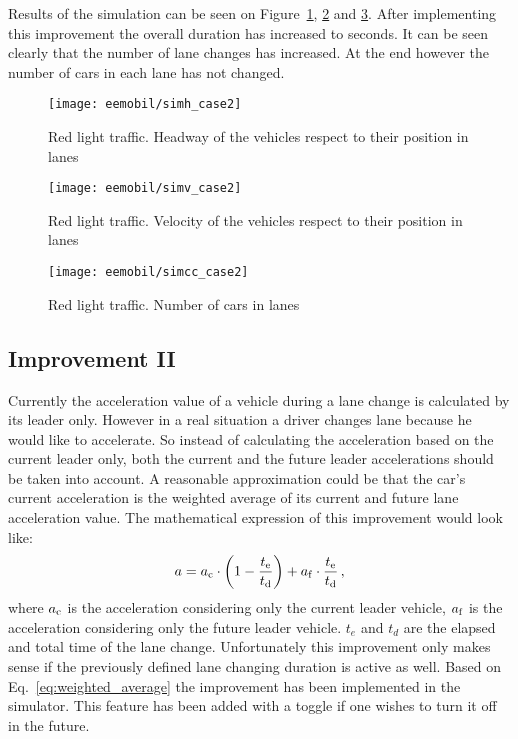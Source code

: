 		Results of the simulation can be seen on Figure~\ref{fig:red_light_situationh_impr1}, \ref{fig:red_light_situationv_impr1} and \ref{fig:red_light_situationcc_impr1}. After implementing this improvement the overall duration has increased to seconds. It can be seen clearly that the number of lane changes has increased. At the end however the number of cars in each lane has not changed.
		\begin{figure}
			\centering
			\texttt{[image: eemobil/simh\_case2]}
			\caption{Red light traffic. Headway of the vehicles respect to their position in lanes}
			\label{fig:red_light_situationh_impr1}
		\end{figure}
		\begin{figure}
			\centering
			\texttt{[image: eemobil/simv\_case2]}
			\caption{Red light traffic. Velocity of the vehicles respect to their position in lanes}
			\label{fig:red_light_situationv_impr1}
		\end{figure}
		\begin{figure}
			\centering
			\texttt{[image: eemobil/simcc\_case2]}
			\caption{Red light traffic. Number of cars in lanes }
			\label{fig:red_light_situationcc_impr1}
		\end{figure}
		\subsection{Improvement II}
		Currently the acceleration value of a vehicle during a lane change is calculated by its leader only. However in a real situation a driver changes lane because he would like to accelerate. So instead of calculating the acceleration based on the current leader only, both the current and the future leader accelerations should be taken into account. A reasonable approximation could be that the car's current acceleration is the weighted average of its current and future lane acceleration value. The mathematical expression of this improvement would look like:
		\begin{equation}
			a=a_{\rm c} \cdot \left(1-\frac{t_{\rm e}}{t_{\rm d}}\right) + a_{\rm f}\cdot \frac{t_{\rm e}}{t_{\rm d}}\,,
			\label{eq:weighted_average}
		\end{equation}
		where $a_{\rm c}$ is the acceleration considering only the current leader vehicle, $a_{\rm f}$ is the acceleration considering only the future leader vehicle. $t_e$ and $t_d$ are the elapsed and total time of the lane change. Unfortunately this improvement only makes sense if the previously defined lane changing duration is active as well. Based on Eq.~\eqref{eq:weighted_average} the improvement has been implemented in the simulator. This feature has been added with a toggle if one wishes to turn it off in the future.
		
